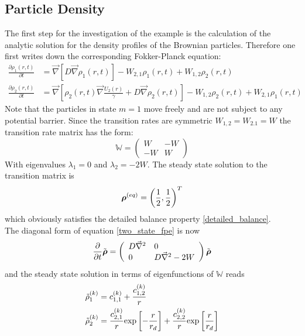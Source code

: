 \subsection{Particle Density}
The first step for the investigation of the example is the calculation of the analytic solution for the density profiles of the Brownian particles. Therefore one first writes down the corresponding Fokker-Planck equation:
\begin{align}
    \frac{\partial \rho_1(r,t)}{\partial t} &= \vec \nabla \left[ D \vec \nabla \rho_1(r,t) \right] - W_{2,1}\rho_1(r,t) + W_{1,2}\rho_2(r,t) \nonumber \\
    \frac{\partial \rho_2(r,t)}{\partial t} &= \vec \nabla \left[\rho_2(r,t) \vec \nabla \frac{U_2(r)}{\gamma} + D \vec \nabla \rho_2(r,t) \right] - W_{1,2}\rho_2(r,t) + W_{2,1}\rho_1(r,t)
    \label{two_state_fpe}
\end{align}
Note that the particles in state $m=1$ move freely and are not subject to any potential barrier. 
Since the transition rates are symmetric $W_{1,2} = W_{2.1} = W$  the transition rate matrix has the form:
\begin{equation}
    \mathbb{W} = \left( \begin{array}{rr}
    W & -W \\
    -W & W 
\end{array} \right)
    \label{two_state_transition_matrix}
\end{equation}
With eigenvalues $\lambda_1 = 0$ and $\lambda_2 = -2W$. The steady state solution to the transition matrix is 
\begin{equation}
    \boldsymbol{\mathbf{\rho}}^{(eq)}=\left(\frac{1}{2}, \frac{1}{2}\right)^{T}
    \label{rhoeq}
\end{equation}
which obviously satisfies the detailed balance property \eqref{detailed_balance}. \\
The diagonal form of equation \eqref{two_state_fpe} is now 
\begin{equation}
    \frac{\partial}{\partial t} \tilde{\boldsymbol{\mathbf{\rho}}} = \left( \begin{array}{ll}
        D\vec{\nabla}^{2} & 0 \\
        0 & D\vec{\nabla}^{2} - 2W
    \end{array} \right) \tilde{\boldsymbol{\mathbf{\rho}}}
    \label{fpmeq5}
\end{equation}
and the steady state solution in terms of eigenfunctions of $\mathbb{W}$ reads
\begin{align}
    \tilde{\rho}_1^{(k)} &= c_{1,1}^{(k)} + \frac{c_{1,2}^{(k)}}{r} \\
    \tilde{\rho}_2^{(k)} &= \frac{c_{2,1}^{(k)}}{r}{\rm exp}\left[-\frac{r}{r_d}\right]+ \frac{c_{2,2}^{(k)}}{r}{\rm exp}\left[\frac{r}{r_d}\right]
    \label{ind_sol_U2}
\end{align}
